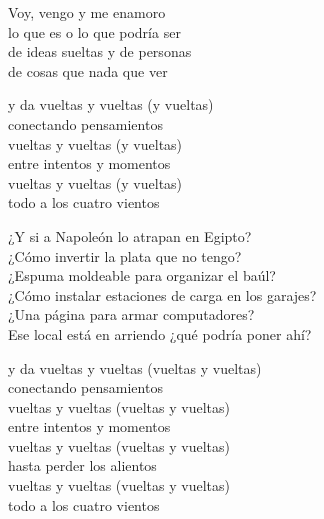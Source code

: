 \begin{lyrics}
Voy, vengo y me enamoro\\
lo que es o lo que podría ser\\
de ideas sueltas y de personas\\
de cosas que nada que ver

y da vueltas y vueltas (y vueltas)\\
conectando pensamientos\\
vueltas y vueltas (y vueltas)\\
entre intentos y momentos\\
vueltas y vueltas (y vueltas)\\
todo a los cuatro vientos

¿Y si a Napoleón lo atrapan en Egipto?\\
¿Cómo invertir la plata que no tengo?\\
¿Espuma moldeable para organizar el baúl?\\
¿Cómo instalar estaciones de carga en los garajes?\\
¿Una página para armar computadores?\\
Ese local está en arriendo ¿qué podría poner ahí?

y da vueltas y vueltas
(vueltas y vueltas)\\
conectando pensamientos\\
vueltas y vueltas
(vueltas y vueltas)\\
entre intentos y momentos\\
vueltas y vueltas
(vueltas y vueltas)\\
hasta perder los alientos\\
vueltas y vueltas
(vueltas y vueltas)\\
todo a los cuatro vientos
\end{lyrics}

